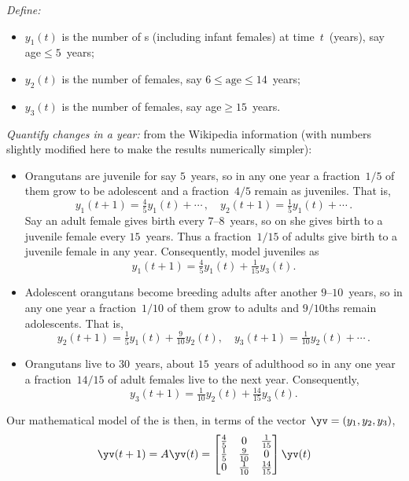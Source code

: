 \begin{example}[orangutans]
\begin{solution}
\emph{Define:}
\begin{itemize}
\item \(y_1(t)\) is the number of  s (including infant females) at time~\(t\)~(years), say age\({}\leq5\)~years;
\item \(y_2(t)\) is the number of  females, say \(6\leq\text{age}\leq 14\)~years;
\item \(y_3(t)\) is the number of  females, say age\({}\geq15\)~years.
\end{itemize}
\emph{Quantify changes in a year:} from the Wikipedia information (with numbers slightly modified here to make the results numerically simpler):
\begin{itemize}
\item Orangutans are juvenile for say \(5\)~years, so in any one year a fraction~\(1/5\) of them grow to be adolescent and a fraction~\(4/5\) remain as juveniles.
That is,
\begin{equation*}
y_1(t+1)=\tfrac45y_1(t)+\cdots\,,\quad y_2(t+1)=\tfrac15y_1(t)+\cdots\,.
\end{equation*}
Say an adult female gives birth every \(7\)--\(8\)~years, so on  she gives birth to a juvenile female every \(15\)~years. 
Thus a fraction~\(1/15\) of adults give birth to a juvenile female in any year.
Consequently, model juveniles as 
\begin{equation*}
{y_1}(t+1)=\tfrac45y_1(t)+\tfrac1{15}y_3(t).
\end{equation*}
\item Adolescent orangutans become breeding adults after another \(9\)--\(10\)~years, so in any one year a fraction~\(1/10\) of them grow to adults and \(9/10\)ths remain adolescents.
That is, 
\begin{equation*}
{y_2(t+1)}=\tfrac15y_1(t)+\tfrac9{10}y_2(t),\quad
{y_3(t+1)}=\tfrac1{10}y_2(t)+\cdots\,.
\end{equation*}

\item Orangutans live to 30~years, about \(15\)~years of adulthood so in any one year a fraction~\(14/15\) of adult females live to the next year.  
Consequently, 
\begin{equation*}
{y_3(t+1)}=\tfrac1{10}y_2(t)+\tfrac{14}{15}y_3(t).
\end{equation*}

\end{itemize}

Our mathematical model of the  is then, in terms of the vector \(\yv=(y_1,y_2,y_3)\),  
\begin{equation*}
\yv(t+1)=A\yv(t)
=\begin{bmatrix} \frac45&0&\frac1{15}
\\\frac15&\frac9{10}&0
\\0&\frac1{10}&\frac{14}{15} \end{bmatrix}\yv(t)
\end{equation*}


\end{solution}
\end{example}
